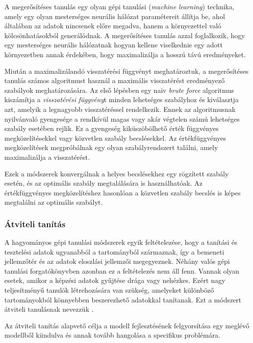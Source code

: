 \documentclass[12pt,a4]{article}
\begin{document}
	A megerősítéses tanulás egy olyan gépi tanulási (\textit{machine learning}) technika, amely egy olyan
	mesterséges neurális hálózat paramétereit állítja be, ahol általában az adatok nincsenek előre megadva, hanem a környezettel való kölcsönhatásokból generálódnak. A megerősítéses tanulás azzal foglalkozik, hogy egy mesterséges neurális hálózatnak hogyan kellene viselkednie egy adott környezetben annak érdekében, hogy maximalizálja a hosszú távú 
	eredményeket.
	
	Miután a maximalizálandó visszatérési függvényt meghatároztuk, a megerősítéses tanulás számos algoritmust használ a maximális visszatérést eredményező szabályok meghatározására. Az első lépésben egy naiv \textit{brute force} algoritmus kiszámítja a \textit{visszatérési függvény}t minden lehetséges szabályhoz és kiválasztja azt, amelyik a legnagyobb visszatéréssel rendelkezik. Ennek az algoritmusnak nyilvánvaló gyengesége a rendkívül magas vagy akár végtelen számú lehetséges szabály esetében rejlik. Ez a gyengeség kiküszöbölhető érték függvényes megközelítésekkel vagy közvetlen szabály becslésekkel. Az értékfüggvényes megközelítések megpróbálnak
	egy olyan szabályrendszert találni, amely maximalizálja a visszatérést.
	
	Ezek a módszerek konvergálnak a helyes becslésekhez egy rögzített szabály esetén, és az optimális szabály megtalálására is használhatóak. Az értékfüggvényes megközelítéshez hasonlóan a közvetlen szabály becslés is képes megtalálni az optimális szabályt.

    \subsubsection{Átviteli tanítás}
    
     A hagyományos gépi tanulási módszerek egyik feltételezése, hogy a tanítási és tesztelési adatok ugyanabból a tartományból származnak, így a bemeneti jellemzőtér és az adatok eloszlási jellemzői megegyeznek. Néhány valós gépi tanulási forgatókönyvben azonban ez a feltételezés nem áll fenn. Vannak olyan esetek, amikor a képzési adatok gyűjtése drága vagy nehézkes. Ezért nagy teljesítményű tanulók létrehozására van szükség, amelyeket különböző tartományokból könnyebben beszerezhető adatokkal tanítanak. Ezt a módszert átviteli tanulásnak nevezzük \cite{tl}.

     Az átviteli tanítás alapvető célja a modell fejlesztésének felgyorsítása egy meglévő modellből kiindulva és annak tovább hangolása a specifikus problémára.
 
\end{document}
